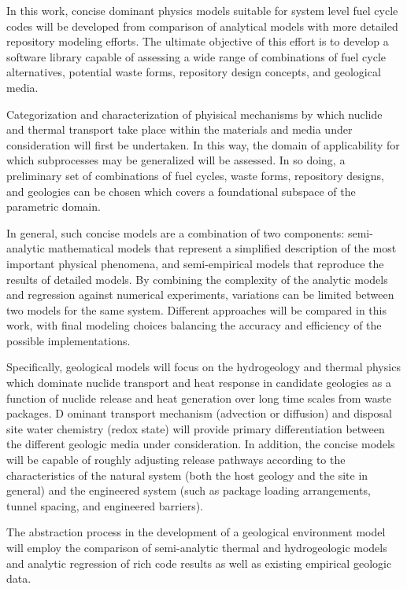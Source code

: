 In this work, concise dominant physics models suitable for system 
level fuel cycle codes will be developed from comparison of analytical 
models with more detailed repository modeling efforts. The ultimate 
objective of this effort is to develop a software library capable of 
assessing a wide range of combinations of fuel cycle alternatives, 
potential waste forms, repository design concepts, and geological 
media. 

Categorization and characterization of phyisical mechanisms by which 
nuclide and thermal transport take place within the materials and 
media under consideration will first be undertaken. In this way, the 
domain of applicability for which subprocesses may be generalized will 
be assessed. In so doing, a preliminary set of combinations of fuel 
cycles, waste forms, repository designs, and geologies can be chosen 
which covers a foundational subspace of the parametric domain. 

In general, such concise models are a combination of two components: 
semi-analytic mathematical models that represent a simplified 
description of the most important physical phenomena, and 
semi-empirical models that reproduce the results of detailed models.  
By combining the complexity of the analytic models and regression 
against numerical experiments, variations can be limited between two 
models for the same system.  Different approaches will be compared in 
this work, with final modeling choices balancing the accuracy and 
efficiency of the possible implementations.  

Specifically, geological models will focus on the hydrogeology and 
thermal physics which dominate nuclide transport and heat response in 
candidate geologies as a function of nuclide release and heat 
generation over long time scales from waste packages.  D ominant 
transport mechanism (advection or diffusion) and disposal site water 
chemistry (redox state) will provide primary differentiation between 
the different geologic media under consideration. In addition, the 
concise models will be capable of roughly adjusting release pathways 
according to the characteristics of the natural system (both the host 
geology and the site in general) and the engineered system (such as 
package loading arrangements, tunnel spacing, and engineered 
barriers).

The abstraction process in the development of a geological environment 
model will employ the comparison of semi-analytic thermal and 
hydrogeologic models and analytic regression of rich code results as 
well as existing empirical geologic data.  

